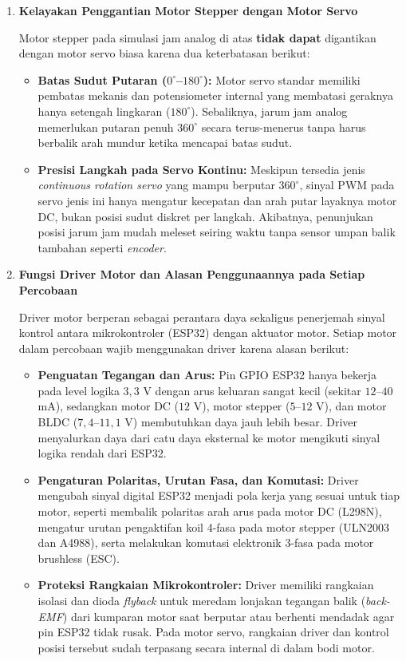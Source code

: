 \begin{enumerate}
    \item \textbf{Kelayakan Penggantian Motor Stepper dengan Motor Servo}

    Motor stepper pada simulasi jam analog di atas \textbf{tidak dapat} digantikan dengan motor servo biasa karena dua keterbatasan berikut:
    \begin{itemize}
        \item \textbf{Batas Sudut Putaran ($0^\circ$--$180^\circ$):} Motor servo standar memiliki pembatas mekanis dan potensiometer internal yang membatasi geraknya hanya setengah lingkaran ($180^\circ$). Sebaliknya, jarum jam analog memerlukan putaran penuh $360^\circ$ secara terus-menerus tanpa harus berbalik arah mundur ketika mencapai batas sudut.
        \item \textbf{Presisi Langkah pada Servo Kontinu:} Meskipun tersedia jenis \textit{continuous rotation servo} yang mampu berputar $360^\circ$, sinyal PWM pada servo jenis ini hanya mengatur kecepatan dan arah putar layaknya motor DC, bukan posisi sudut diskret per langkah. Akibatnya, penunjukan posisi jarum jam mudah meleset seiring waktu tanpa sensor umpan balik tambahan seperti \textit{encoder}.
    \end{itemize}

    \item \textbf{Fungsi Driver Motor dan Alasan Penggunaannya pada Setiap Percobaan}

    Driver motor berperan sebagai perantara daya sekaligus penerjemah sinyal kontrol antara mikrokontroler (ESP32) dengan aktuator motor. Setiap motor dalam percobaan wajib menggunakan driver karena alasan berikut:
    \begin{itemize}
        \item \textbf{Penguatan Tegangan dan Arus:} Pin GPIO ESP32 hanya bekerja pada level logika $3,3$ V dengan arus keluaran sangat kecil (sekitar $12$--$40$ mA), sedangkan motor DC ($12$ V), motor stepper ($5$--$12$ V), dan motor BLDC ($7,4$--$11,1$ V) membutuhkan daya jauh lebih besar. Driver menyalurkan daya dari catu daya eksternal ke motor mengikuti sinyal logika rendah dari ESP32.
        \item \textbf{Pengaturan Polaritas, Urutan Fasa, dan Komutasi:} Driver mengubah sinyal digital ESP32 menjadi pola kerja yang sesuai untuk tiap motor, seperti membalik polaritas arah arus pada motor DC (L298N), mengatur urutan pengaktifan koil 4-fasa pada motor stepper (ULN2003 dan A4988), serta melakukan komutasi elektronik 3-fasa pada motor brushless (ESC).
        \item \textbf{Proteksi Rangkaian Mikrokontroler:} Driver memiliki rangkaian isolasi dan dioda \textit{flyback} untuk meredam lonjakan tegangan balik (\textit{back-EMF}) dari kumparan motor saat berputar atau berhenti mendadak agar pin ESP32 tidak rusak. Pada motor servo, rangkaian driver dan kontrol posisi tersebut sudah terpasang secara internal di dalam bodi motor.
    \end{itemize}
\end{enumerate}

